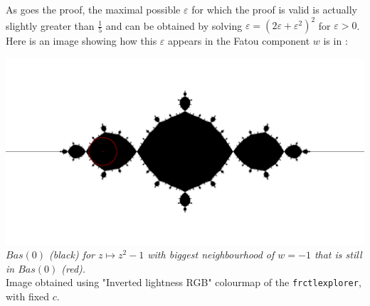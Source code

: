 \documentclass{article}
\begin{document}
As goes the proof, the maximal possible $\varepsilon$ for which the proof is valid is actually slightly greater than $\frac{1}{5}$ and can be obtained by solving $\varepsilon = (2 \varepsilon + \varepsilon^2)^2$ for $\varepsilon > 0$. Here is an image showing how this $\varepsilon$ appears in the Fatou component $w$ is in : \\
\begin{center}
\includegraphics[scale=0.3]{20231028105914}
\textit{$Bas(0)$ (black) for $z \mapsto z^2-1$ with biggest neighbourhood of $w = -1$ that is still in $Bas(0)$ (red).} \\
Image obtained using "Inverted lightness RGB" colourmap of the \texttt{frctlexplorer}, with fixed $c$.
\end{center}




\end{document}
